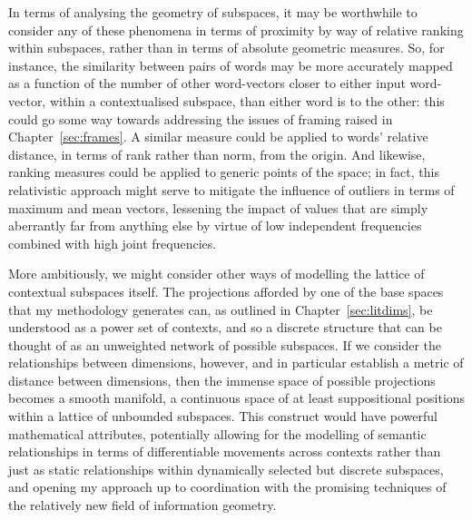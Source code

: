 In terms of analysing the geometry of subspaces, it may be worthwhile to consider any of these phenomena in terms of proximity by way of relative ranking within subspaces, rather than in terms of absolute geometric measures.  So, for instance, the similarity between pairs of words may be more accurately mapped as a function of the number of other word-vectors closer to either input word-vector, within a contextualised subspace, than either word is to the other: this could go some way towards addressing the issues of framing raised in Chapter~\ref{sec:frames}.  A similar measure could be applied to words' relative distance, in terms of rank rather than norm, from the origin.  And likewise, ranking measures could be applied to generic points of the space; in fact, this relativistic approach might serve to mitigate the influence of outliers in terms of maximum and mean vectors, lessening the impact of values that are simply aberrantly far from anything else by virtue of low independent frequencies combined with high joint frequencies.

More ambitiously, we might consider other ways of modelling the lattice of contextual subspaces itself.  The projections afforded by one of the base spaces that my methodology generates can, as outlined in Chapter~\ref{sec:litdims}, be understood as a power set of contexts, and so a discrete structure that can be thought of as an unweighted network of possible subspaces.  If we consider the relationships between dimensions, however, and in particular establish a metric of distance between dimensions, then the immense space of possible projections becomes a smooth manifold, a continuous space of at least suppositional positions within a lattice of unbounded subspaces.  This construct would have powerful mathematical attributes, potentially allowing for the modelling of semantic relationships in terms of differentiable movements across contexts rather than just as static relationships within dynamically selected but discrete subspaces, and opening my approach up to coordination with the promising techniques of the relatively new field of information geometry.

